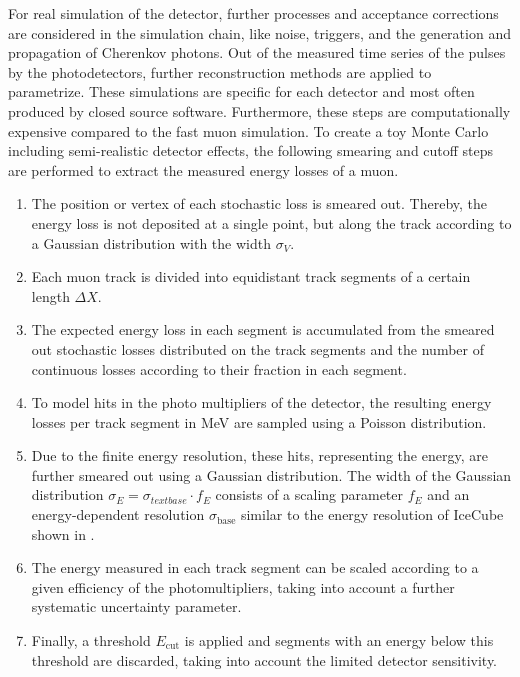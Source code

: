 
For real simulation of the detector, further processes and acceptance corrections are considered in the simulation chain, like noise, triggers, and the generation and propagation of Cherenkov photons.
Out of the measured time series of the pulses by the photodetectors, further reconstruction methods are applied to parametrize.
These simulations are specific for each detector and most often produced by closed source software.
Furthermore, these steps are computationally expensive compared to the fast muon simulation.
To create a toy Monte Carlo including semi-realistic detector effects, the following smearing and cutoff steps are performed to extract the measured energy losses of a muon.
\begin{enumerate}
    \item The position or vertex of each stochastic loss is smeared out. Thereby, the energy loss is not deposited at a single point, but along the track according to a Gaussian distribution with the width $\sigma_V$.
    \item Each muon track is divided into equidistant track segments of a certain length $\Delta X$.
    \item The expected energy loss in each segment is accumulated from the smeared out stochastic losses distributed on the track segments and the number of continuous losses according to their fraction in each segment.
    \item To model hits in the photo multipliers of the detector, the resulting energy losses per track segment in MeV are sampled using a Poisson distribution.
    \item Due to the finite energy resolution, these hits, representing the energy, are further smeared out using a Gaussian distribution. The width of the Gaussian distribution $\sigma_E = \sigma_{text{base}} \cdot f_E$ consists of a scaling parameter $f_E$ and an energy-dependent resolution $\sigma_{\text{base}}$ similar to the energy resolution of IceCube \cite{IceCube2014Ereco} shown in .
    \item The energy measured in each track segment can be scaled according to a given efficiency of the photomultipliers, taking into account a further systematic uncertainty parameter.
    \item Finally, a threshold $E_{\text{cut}}$ is applied and segments with an energy below this threshold are discarded, taking into account the limited detector sensitivity.
\end{enumerate}
